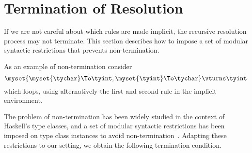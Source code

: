 \section{Termination of Resolution}

If we are not careful about which rules are made implicit, the recursive
resolution process may not terminate. This section describes how to impose 
a set of modular syntactic restrictions that prevents non-termination. 

As an example of non-termination consider 
\begin{equation*}
\myset{
  \myset{\tychar} \To \tyint,
  \myset{\tyint} \To \tychar} \vturns \tyint
\end{equation*}
which loops, using alternatively the first and second rule in the implicit
environment. 

The problem of non-termination has been widely studied in the context of
Haskell's type classes, and a set of modular syntactic restrictions
has been imposed on type class instances to avoid non-termination~\cite{fdchr}. 
Adapting these restrictions to our setting, we obtain the following termination
condition.


% 
